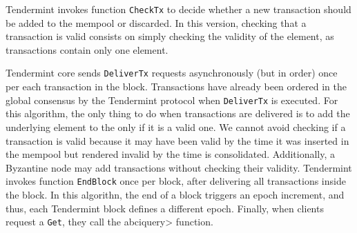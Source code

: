 Tendermint invokes function \texttt{CheckTx} to decide
whether a new transaction should be added to the mempool or discarded.
%
In this version, checking that a transaction is valid consists on simply
checking the validity of the element, as transactions contain only one
element.
%
%
%

%

Tendermint core sends \texttt{DeliverTx} requests
asynchronously (but in order) once per each transaction in the block.
%
Transactions have already been ordered in the global consensus by
the Tendermint protocol when \texttt{DeliverTx} is executed.
%
For this algorithm, the only thing to do when transactions are delivered is to add
the underlying element to the \setchain only if it is a valid one.
We cannot avoid checking if a transaction is valid because it may have been
valid by the time it was inserted in the mempool but rendered invalid by the
time is consolidated.
%
Additionally, a Byzantine node may add transactions without checking their
validity.
%
Tendermint invokes function \texttt{EndBlock} once per block, after delivering
all transactions inside the block.
%
In this algorithn, the end of a block triggers an epoch increment, and thus,
each Tendermint block defines a different \setchain epoch.
%
Finally, when clients request a \texttt{Get}, they call the \<abciquery>
function.

